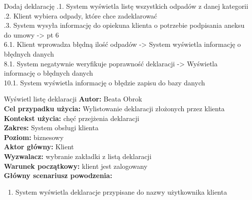 \begin{usecase}{Dodaj deklarację}
			.1. System wyświetla listę wszystkich odpadów z danej kategorii \\
			.2. Klient wybiera odpady, które chce zadeklarować \\
			.3. System wysyła informację do opiekuna klienta o potrzebie podpisania aneksu do umowy -> pt 6 \\
		6.1. Klient wprowadza błędną ilość odpadów -> System wyświetla informację o błędnych danych \\
		8.1. System negatywnie weryfikuje poprawność deklaracji -> Wyświetla informację o błędnych danych \\
		10.1. System wyświetla informację o błędzie zapisu do bazy danych \\
\end{usecase}

\begin{usecase}{Wyświetl listę deklaracji}
	\textbf{Autor:} Beata Obrok \\
	\textbf{Cel przypadku użycia:} Wylistowanie deklaracji złożonych przez klienta \\
	\textbf{Kontekst użycia:} chęć przejżenia deklaracji\\
	\textbf{Zakres:} System obsługi klienta \\
	\textbf{Poziom:} biznesowy \\
	\textbf{Aktor główny:} Klient\\
	\textbf{Wyzwalacz:} wybranie zakładki z listą deklaracji \\
	\textbf{Warunek początkowy:} klient jest zalogowany \\
	\textbf{Główny scenariusz powodzenia:} \\
		\begin{enumerate}
			\item System wyświetla deklaracje przypisane do nazwy użytkownika klienta
		\end{enumerate}
\end{usecase}

